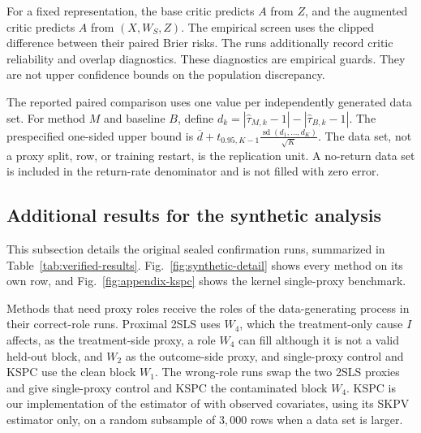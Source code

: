 For a fixed representation, the base critic predicts $A$ from $Z$, and the augmented critic predicts $A$ from $(X,W_S,Z)$. The empirical screen uses the clipped difference between their paired Brier risks. The runs additionally record critic reliability and overlap diagnostics. These diagnostics are empirical guards. They are not upper confidence bounds on the population discrepancy.

The reported paired comparison uses one value per independently generated data set. For method $M$ and baseline $B$, define
\(d_k=|\widehat\tau_{M,k}-1|-|\widehat\tau_{B,k}-1|.\)
The prespecified one-sided upper bound is
\(\overline d+t_{0.95,K-1}\frac{\operatorname{sd}(d_1,\ldots,d_K)}{\sqrt K}.\)
The data set, not a proxy split, row, or training restart, is the replication unit. A no-return data set is included in the return-rate denominator and is not filled with zero error.

\subsection{Additional results for the synthetic analysis}
\label{sec:appendix-synthetic-results}

 This subsection details the original sealed confirmation runs, summarized in Table~\ref{tab:verified-results}. Fig.~\ref{fig:synthetic-detail} shows every method on its own row, and Fig.~\ref{fig:appendix-kspc} shows the kernel single-proxy benchmark.

Methods that need proxy roles receive the roles of the data-generating process in their correct-role runs. Proximal 2SLS uses $W_4$, which the treatment-only cause $I$ affects, as the treatment-side proxy, a role $W_4$ can fill although it is not a valid held-out block, and $W_2$ as the outcome-side proxy, and single-proxy control and KSPC use the clean block $W_1$. The wrong-role runs swap the two 2SLS proxies and give single-proxy control and KSPC the contaminated block $W_4$. KSPC is our implementation of the estimator of \citet{xu2025kernel} with observed covariates, using its SKPV estimator only, on a random subsample of $3{,}000$ rows when a data set is larger.

